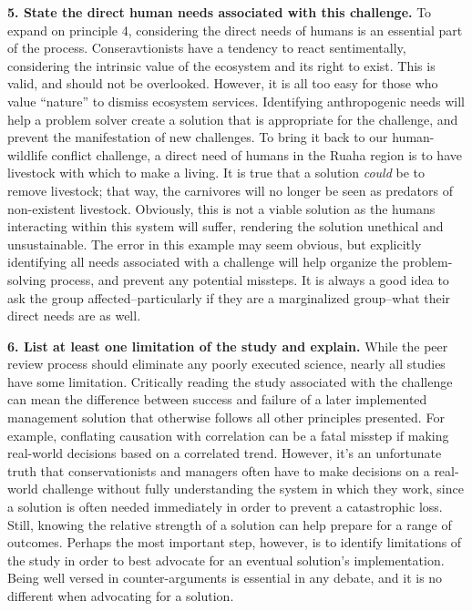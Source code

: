 \documentclass[10pt,letterpaper]{article}
\begin{document}
\textbf{5. State the direct human needs associated with this challenge.}
To expand on principle 4, considering the direct needs of humans is an
essential part of the process. Conseravtionists have a tendency to react
sentimentally, considering the intrinsic value of the ecosystem and its
right to exist. This is valid, and should not be overlooked. However, it
is all too easy for those who value ``nature'' to dismiss ecosystem
services. Identifying anthropogenic needs will help a problem solver
create a solution that is appropriate for the challenge, and prevent the
manifestation of new challenges. To bring it back to our human-wildlife
conflict challenge, a direct need of humans in the Ruaha region is to
have livestock with which to make a living. It is true that a solution
\emph{could} be to remove livestock; that way, the carnivores will no
longer be seen as predators of non-existent livestock. Obviously, this
is not a viable solution as the humans interacting within this system
will suffer, rendering the solution unethical and unsustainable. The
error in this example may seem obvious, but explicitly identifying all
needs associated with a challenge will help organize the problem-solving
process, and prevent any potential missteps. It is always a good idea to
ask the group affected--particularly if they are a marginalized
group--what their direct needs are as well.

\textbf{6. List at least one limitation of the study and explain.} While
the peer review process should eliminate any poorly executed science,
nearly all studies have some limitation. Critically reading the study
associated with the challenge can mean the difference between success
and failure of a later implemented management solution that otherwise
follows all other principles presented. For example, conflating
causation with correlation can be a fatal misstep if making real-world
decisions based on a correlated trend. However, it's an unfortunate
truth that conservationists and managers often have to make decisions on
a real-world challenge without fully understanding the system in which
they work, since a solution is often needed immediately in order to
prevent a catastrophic loss. Still, knowing the relative strength of a
solution can help prepare for a range of outcomes. Perhaps the most
important step, however, is to identify limitations of the study in
order to best advocate for an eventual solution's implementation. Being
well versed in counter-arguments is essential in any debate, and it is
no different when advocating for a solution.
\end{document}
